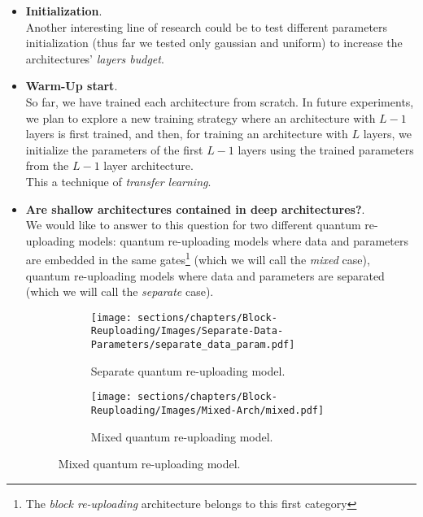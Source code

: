 \begin{itemize}
    \item \textbf{Initialization}.\\
    Another interesting line of research could be to test different parameters initialization (thus far
    we tested only gaussian and uniform) to increase the architectures' \textit{layers budget}.
    
    \item \textbf{Warm-Up start}.\\
    So far, we have trained each architecture from scratch. In future experiments, we plan to explore 
    a new training strategy where an architecture with $L-1$ layers is first trained, and then, 
    for training an architecture with $L$ layers, we initialize the parameters of the first $L-1$ 
    layers using the trained parameters from the $L-1$ layer architecture.\\
    This a technique of \textit{transfer learning}.


    \item \textbf{Are shallow architectures contained in deep architectures?}.\\
    We would like to answer to this question for two different quantum re-uploading models:
    quantum re-uploading models where data and parameters are embedded in the same gates\footnote[1]{The 
    \textit{block re-uploading} architecture belongs to this first category} (which we will call the \textit{mixed}
    case), quantum re-uploading models where data and parameters are separated (which we will call the 
    \textit{separate} case).\\

    \begin{figure}[h]
        \centering
        \begin{subfigure}[b]{0.45\textwidth}
            \centering
            \texttt{[image: sections/chapters/Block-Reuploading/Images/Separate-Data-Parameters/separate\_data\_param.pdf]}
            \caption*{Separate quantum re-uploading model.}
        \end{subfigure}
        \begin{subfigure}[b]{0.45\textwidth}
            \centering
            \texttt{[image: sections/chapters/Block-Reuploading/Images/Mixed-Arch/mixed.pdf]}
            \caption*{Mixed quantum re-uploading model.}
        \end{subfigure}
    \end{figure}


\end{itemize}
